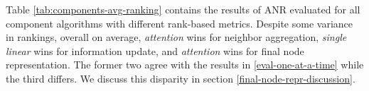 \documentclass{article}
\begin{document}
Table \ref{tab:components-avg-ranking} contains the results of ANR evaluated for all component algorithms with different rank-based metrics. Despite some variance in rankings, overall on average, \textit{attention} wins for neighbor aggregation, \textit{single linear} wins for information update, and \textit{attention} wins for final node representation. The former two agree with the results in \ref{eval-one-at-a-time} while the third differs. We discuss this disparity in section \ref{final-node-repr-discussion}.








\end{document}
